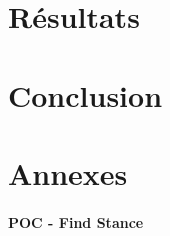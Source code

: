 \documentclass[a4paper,12pt]{article}
\begin{document}
\newpage
\part{Résultats}
	
	\newpage

\part{Conclusion}
	
	\newpage

\newpage
\part{Annexes}
	\subsection{POC - Find Stance}
	\label{annexe-stance-detection}	%
	
\end{document}
